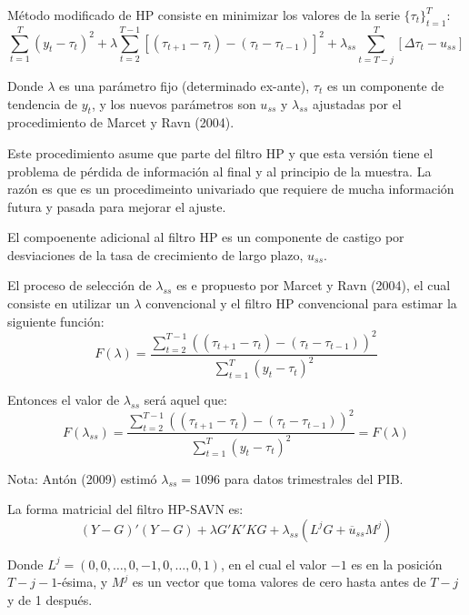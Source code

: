 \documentclass[
]{book}
\begin{document}
Método modificado de HP consiste en minimizar los valores de la serie \(\{ \tau_t \}_{t=1}^T\):
\begin{equation}
  \sum_{t=1}^T (y_t - \tau_t)^2 + \lambda \sum_{t=2}^{T-1} [(\tau_{t+1} - \tau_t) - (\tau_t     - \tau_{t-1})]^2 + \lambda_{ss} \sum_{t=T-j}^{T} [\Delta \tau_t - u_{ss}]
\end{equation}

Donde \(\lambda\) es una parámetro fijo (determinado ex-ante), \(\tau_t\) es un componente de tendencia de \(y_t\), y los nuevos parámetros son \(u_{ss}\) y \(\lambda_{ss}\) ajustadas por el procedimiento de Marcet y Ravn (2004).

Este procedimiento asume que parte del filtro HP y que esta versión tiene el problema de pérdida de información al final y al principio de la muestra. La razón es que es un procedimeinto univariado que requiere de mucha información futura y pasada para mejorar el ajuste.

El compoenente adicional al filtro HP es un componente de castigo por desviaciones de la tasa de crecimiento de largo plazo, \(u_{ss}\).

El proceso de selección de \(\lambda_{ss}\) es e propuesto por Marcet y Ravn (2004), el cual consiste en utilizar un \(\lambda\) convencional y el filtro HP convencional para estimar la siguiente función:
\begin{equation}
  F(\lambda) = \frac{\sum_{t=2}^{T-1} ((\tau_{t+1} - \tau_t) - (\tau_t -                 \tau_{t-1}))^2}{\sum_{t=1}^T (y_t - \tau_t)^2}
\end{equation}

Entonces el valor de \(\lambda_{ss}\) será aquel que:
\begin{equation}
  F(\lambda_{ss}) = \frac{\sum_{t=2}^{T-1} ((\tau_{t+1} - \tau_t) - (\tau_t - \tau_{t-1}))^2}{\sum_{t=1}^T (y_t - \tau_t)^2} = F(\lambda)
\end{equation}

Nota: Antón (2009) estimó \(\lambda_{ss} = 1096\) para datos trimestrales del PIB.

La forma matricial del filtro HP-SAVN es:
\begin{equation}
  (Y - G)'(Y - G) + \lambda G' K' K G + \lambda_{ss} (L^j G + \overline{u}_{ss} M^j)
\end{equation}

Donde \(L^j = (0, 0, \ldots, 0, -1, 0, \ldots, 0, 1)\), en el cual el valor \(-1\) es en la posición \(T-j-1\)-ésima, y \(M^j\) es un vector que toma valores de cero hasta antes de \(T-j\) y de 1 después.
\end{document}
